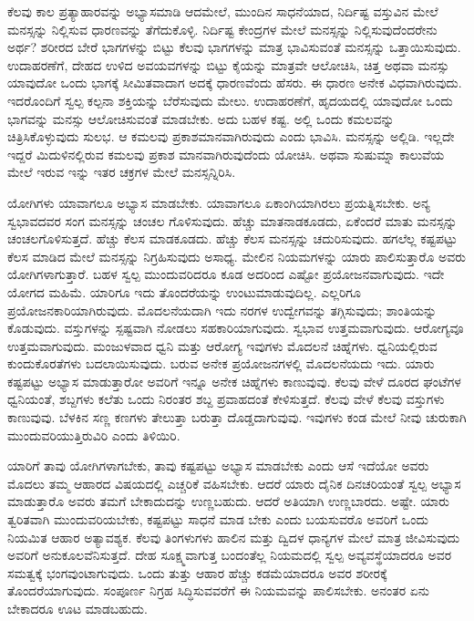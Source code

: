 ಕೆಲವು ಕಾಲ ಪ್ರತ್ಯಾಹಾರವನ್ನು ಅಭ್ಯಾಸಮಾಡಿ ಆದಮೇಲೆ, ಮುಂದಿನ ಸಾಧನೆಯಾದ, ನಿರ್ದಿಷ್ಟ ವಸ್ತುವಿನ ಮೇಲೆ ಮನಸ್ಸನ್ನು ನಿಲ್ಲಿಸುವ ಧಾರಣವನ್ನು ತೆಗೆದುಕೊಳ್ಳಿ. ನಿರ್ದಿಷ್ಟ ಕೇಂದ್ರಗಳ ಮೇಲೆ ಮನಸ್ಸನ್ನು ನಿಲ್ಲಿಸುವುದೆಂದರೇನು ಅರ್ಥ? ಶರೀರದ ಬೇರೆ ಭಾಗಗಳನ್ನು ಬಿಟ್ಟು ಕೆಲವು ಭಾಗಗಳನ್ನು ಮಾತ್ರ ಭಾವಿಸುವಂತೆ ಮನಸ್ಸನ್ನು ಒತ್ತಾಯಿಸುವುದು. ಉದಾಹರಣೆಗೆ, ದೇಹದ ಉಳಿದ ಅವಯವಗಳನ್ನು ಬಿಟ್ಟು ಕೈಯನ್ನು ಮಾತ್ರವೇ ಆಲೋಚಿಸಿ, ಚಿತ್ತ ಅಥವಾ ಮನಸ್ಸು ಯಾವುದೋ ಒಂದು ಭಾಗಕ್ಕೆ ಸೀಮಿತವಾದಾಗ ಅದಕ್ಕೆ ಧಾರಣವೆಂದು ಹೆಸರು. ಈ ಧಾರಣ ಅನೇಕ ವಿಧವಾಗಿರುವುದು. ಇದರೊಂದಿಗೆ ಸ್ವಲ್ಪ ಕಲ್ಪನಾ ಶಕ್ತಿಯನ್ನು ಬೆರೆಸುವುದು ಮೇಲು. ಉದಾಹರಣೆಗೆ, ಹೃದಯದಲ್ಲಿ ಯಾವುದೋ ಒಂದು ಭಾಗವನ್ನು ಮನಸ್ಸು ಆಲೋಚಿಸುವಂತೆ ಮಾಡಬೇಕು. ಅದು ಬಹಳ ಕಷ್ಟ. ಅಲ್ಲಿ ಒಂದು ಕಮಲವನ್ನು ಚಿತ್ರಿಸಿಕೊಳ್ಳುವುದು ಸುಲಭ. ಆ ಕಮಲವು ಪ್ರಕಾಶಮಾನವಾಗಿರುವುದು ಎಂದು ಭಾವಿಸಿ. ಮನಸ್ಸನ್ನು ಅಲ್ಲಿಡಿ. ಇಲ್ಲದೇ ಇದ್ದರೆ ಮಿದುಳಿನಲ್ಲಿರುವ ಕಮಲವು ಪ್ರಕಾಶ ಮಾನವಾಗಿರುವುದೆಂದು ಯೋಚಿಸಿ. ಅಥವಾ ಸುಷುಮ್ನಾ ಕಾಲುವೆಯ ಮೇಲೆ ಇರುವ ಇನ್ನು ಇತರ ಚಕ್ರಗಳ ಮೇಲೆ ಮನಸ್ಸನ್ನಿರಿಸಿ. 

ಯೋಗಿಗಳು ಯಾವಾಗಲೂ ಅಭ್ಯಾಸ ಮಾಡಬೇಕು. ಯಾವಾಗಲೂ ಏಕಾಂಗಿಯಾಗಿ\break ರಲು ಪ್ರಯತ್ನಿಸಬೇಕು. ಅನ್ಯ ಸ್ವಭಾವದವರ ಸಂಗ ಮನಸ್ಸನ್ನು ಚಂಚಲ ಗೊಳಿಸುವುದು. ಹೆಚ್ಚು ಮಾತನಾಡಕೂಡದು, ಏಕೆಂದರೆ ಮಾತು ಮನಸ್ಸನ್ನು ಚಂಚಲಗೊಳಿಸುತ್ತದೆ. ಹೆಚ್ಚು ಕೆಲಸ ಮಾಡಕೂಡದು. ಹೆಚ್ಚು ಕೆಲಸ ಮನಸ್ಸನ್ನು ಚದುರಿಸುವುದು. ಹಗಲೆಲ್ಲ ಕಷ್ಟಪಟ್ಟು ಕೆಲಸ ಮಾಡಿದ ಮೇಲೆ ಮನಸ್ಸನ್ನು ನಿಗ್ರಹಿಸುವುದು ಅಸಾಧ್ಯ. ಮೇಲಿನ ನಿಯಮಗಳನ್ನು ಯಾರು ಪಾಲಿಸುತ್ತಾರೊ ಅವರು ಯೋಗಿಗಳಾಗುತ್ತಾರೆ. ಬಹಳ ಸ್ವಲ್ಪ ಮುಂದುವರಿದರೂ ಕೂಡ ಅದರಿಂದ ಎಷ್ಟೋ ಪ್ರಯೋಜನವಾಗುವುದು. ಇದೇ ಯೋಗದ ಮಹಿಮೆ. ಯಾರಿಗೂ ಇದು ತೊಂದರೆಯನ್ನು ಉಂಟುಮಾಡುವುದಿಲ್ಲ. ಎಲ್ಲರಿಗೂ ಪ್ರಯೋಜನಕಾರಿಯಾಗಿರುವುದು. ಮೊದಲನೆಯದಾಗಿ ಇದು ನರಗಳ ಉದ್ವೇಗವನ್ನು ತಗ್ಗಿಸುವುದು; ಶಾಂತಿಯನ್ನು ಕೊಡುವುದು. ವಸ್ತುಗಳನ್ನು ಸ್ಪಷ್ಟವಾಗಿ ನೋಡಲು ಸಹಕಾರಿಯಾಗುವುದು. ಸ್ವಭಾವ ಉತ್ತಮವಾಗುವುದು. ಆರೋಗ್ಯವೂ ಉತ್ತಮವಾಗುವುದು. ಮಂಜುಳವಾದ ಧ್ವನಿ ಮತ್ತು ಆರೋಗ್ಯ ಇವುಗಳು ಮೊದಲನೆ ಚಿಹ್ನೆಗಳು. ಧ್ವನಿಯಲ್ಲಿರುವ ಕುಂದುಕೊರತೆಗಳು ಬದಲಾಯಿಸುವುದು. ಬರುವ ಅನೇಕ ಪ್ರಯೋಜನಗಳಲ್ಲಿ ಮೊದಲನೆಯದು ಇದು. ಯಾರು ಕಷ್ಟಪಟ್ಟು ಅಭ್ಯಾಸ ಮಾಡುತ್ತಾರೋ ಅವರಿಗೆ ಇನ್ನೂ ಅನೇಕ ಚಿಹ್ನೆಗಳು ಕಾಣುವುವು. ಕೆಲವು ವೇಳೆ ದೂರದ ಘಂಟೆಗಳ ಧ್ವನಿಯಂತೆ, ಶಬ್ದಗಳು ಕಲೆತು ಒಂದು ನಿರಂತರ ಶಬ್ದ ಪ್ರವಾಹದಂತೆ ಕೇಳಿಸುತ್ತದೆ. ಕೆಲವು ವೇಳೆ ಕೆಲವು ವಸ್ತುಗಳು ಕಾಣುವುವು. ಬೆಳಕಿನ ಸಣ್ಣ ಕಣಗಳು ತೇಲುತ್ತಾ ಬರುತ್ತಾ ದೊಡ್ಡದಾಗುವುವು. ಇವುಗಳು ಕಂಡ ಮೇಲೆ ನೀವು ಚುರುಕಾಗಿ ಮುಂದುವರಿಯುತ್ತಿರುವಿರಿ ಎಂದು ತಿಳಿಯಿರಿ. 

ಯಾರಿಗೆ ತಾವು ಯೋಗಿಗಳಾಗಬೇಕು, ತಾವು ಕಷ್ಟಪಟ್ಟು ಅಭ್ಯಾಸ ಮಾಡಬೇಕು ಎಂದು ಆಸೆ ಇದೆಯೋ ಅವರು ಮೊದಲು ತಮ್ಮ ಆಹಾರದ ವಿಷಯದಲ್ಲಿ ಎಚ್ಚರಿಕೆ ವಹಿಸ\break ಬೇಕು. ಆದರೆ ಯಾರು ದೈನಿಕ ದಿನಚರಿಯಂತೆ ಸ್ವಲ್ಪ ಅಭ್ಯಾಸ ಮಾಡುತ್ತಾರೊ ಅವರು ತಮಗೆ ಬೇಕಾದುದನ್ನು ಉಣ್ಣಬಹುದು. ಆದರೆ ಅತಿಯಾಗಿ ಉಣ್ಣಬಾರದು. ಅಷ್ಟೇ. ಯಾರು ತ್ವರಿತವಾಗಿ ಮುಂದುವರಿಯಬೇಕು, ಕಷ್ಟಪಟ್ಟು ಸಾಧನೆ ಮಾಡ ಬೇಕು ಎಂದು ಬಯಸುವರೊ ಅವರಿಗೆ ಒಂದು ನಿಯಮಿತ ಆಹಾರ ಅತ್ಯಾವಶ್ಯಕ. ಕೆಲವು ತಿಂಗಳುಗಳು ಹಾಲಿನ ಮತ್ತು ದ್ವಿದಳ ಧಾನ್ಯಗಳ ಮೇಲೆ ಮಾತ್ರ ಜೀವಿಸುವುದು ಅವರಿಗೆ ಅನುಕೂಲವೆನಿಸುತ್ತದೆ. ದೇಹ ಸೂಕ್ಷ್ಮವಾಗುತ್ತ ಬಂದಂತೆಲ್ಲ ನಿಯಮದಲ್ಲಿ ಸ್ವಲ್ಪ ಅವ್ಯವಸ್ಥೆಯಾದರೂ ಅವರ ಸಮತ್ವಕ್ಕೆ ಭಂಗವುಂಟಾಗುವುದು. ಒಂದು ತುತ್ತು ಆಹಾರ ಹೆಚ್ಚು ಕಡಮೆಯಾದರೂ ಅವರ ಶರೀರಕ್ಕೆ ತೊಂದರೆಯಾಗುವುದು. ಸಂಪೂರ್ಣ ನಿಗ್ರಹ ಸಿದ್ಧಿಸುವವರೆಗೆ ಈ ನಿಯಮವನ್ನು ಪಾಲಿಸಬೇಕು. ಅನಂತರ ಏನು ಬೇಕಾದರೂ ಊಟ ಮಾಡಬಹುದು. 

